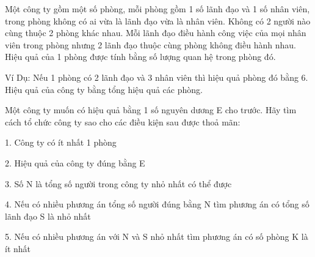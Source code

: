Một công ty gồm một số phòng, mỗi phòng gồm 1 số lãnh đạo và 1 số nhân viên, trong phòng không có ai vừa là lãnh đạo vừa là nhân viên. Không có 2 người nào cùng thuộc 2 phòng khác nhau. Mỗi lãnh đạo điều hành công việc của mọi nhân viên trong phòng nhưng 2 lãnh đạo thuộc cùng phòng không điều hành nhau. Hiệu quả của 1 phòng được tính bằng số lượng quan hệ trong phòng đó.  

   Ví Dụ: Nếu 1 phòng có 2 lãnh đạo và 3 nhân viên thì hiệu quả phòng đó bằng 6. Hiệu quả của công ty bằng tổng hiệu quả các phòng.  

   Một công ty muốn có hiệu quả bằng 1 số nguyên dương E cho trước. Hãy tìm cách tổ chức công ty sao cho các điều kiện sau được thoả mãn:  

   1. Công ty có ít nhất 1 phòng  

   2. Hiệu quả của công ty đúng bằng E  

   3. Số N là tổng số người trong công ty nhỏ nhất có thể được  

   4. Nếu có nhiều phương án tổng số người đúng bằng N tìm phương án có tổng số lãnh đạo S là nhỏ nhất  

   5. Nếu có nhiều phương án với N và S nhỏ nhất tìm phương án có số phòng K là ít nhất
